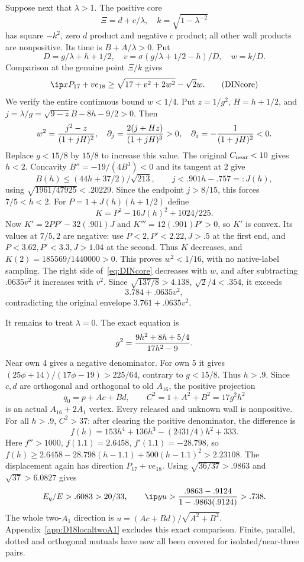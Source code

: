 Suppose next that \(\lambda>1\).
The positive core
\[
 \Xi=d+c/\lambda,\quad k=\sqrt{1-\lambda^{-2}}
\]
has square \(-k^2\), zero \(d\) product and negative \(c\)
product; all other wall products are nonpositive.
Its time is \(B+A/\lambda>0\).
Put
\[
 D=g/\lambda+h+1/2,\quad
 v=\sigma(g/\lambda+1/2-h)/D,\quad w=k/D.
\]
Comparison at the genuine point \(\Xi/k\) gives
\[
 \ip x{P_{17}+ve_{18}}
 \ge\sqrt{17+v^2+2w^2}-\sqrt2w .
\tag{DINcore}\label{eq:DINcore}
\]
We verify the entire continuous bound \(w<1/4\).
Put \(z=1/g^2\), \(H=h+1/2\), and
\(j=\lambda/g=\sqrt{9-z}B-8h-9/2>0\).
Then
\[
 w^2={j^2-z\over(1+jH)^2},\quad
 \partial_j={2(j+Hz)\over(1+jH)^3}>0,\quad
 \partial_z=-{1\over(1+jH)^2}<0 .
\]
Replace \(g<15/8\) by \(15/8\) to increase this value.
The original \(C_{\rm near}<10\) gives \(h<2\).
Concavity \(B''=-19/(4B^3)<0\) and its tangent at 2 give
\[
 B(h)\le(44h+37/2)/\sqrt{213},\qquad
 j<.901h-.757=:J(h),
\]
using \(\sqrt{1961/47925}<.20229\).
Since the endpoint \(j>8/15\), this forces \(7/5<h<2\).
For \(P=1+J(h)(h+1/2)\) define
\[
 K=P^2-16J(h)^2+1024/225 .
\]
Now \(K'=2PP'-32(.901)J\) and
\(K'''=12(.901)P'>0\), so \(K'\) is convex.
Its values at \(7/5,2\) are negative:
use \(P<2,P'<2.22,J>.5\) at the first end,
and \(P<3.62,P'<3.3,J>1.04\) at the second.
Thus \(K\) decreases, and
\(K(2)=185569/1440000>0\).
This proves \(w^2<1/16\), with no native-label sampling.
The right side of~\eqref{eq:DINcore} decreases with \(w\),
and after subtracting \(.0635v^2\) it increases with \(v^2\).
Since \(\sqrt{137/8}>4.138\), \(\sqrt2/4<.354\), it exceeds
\[
                3.784+.0635v^2,
\]
contradicting the original envelope
\(3.761+.0635v^2\).

It remains to treat \(\lambda=0\).
The exact equation is
\[
 g^2={9h^2+8h+5/4\over17h^2-9}.
\]
Near own 4 gives a negative denominator.
For own 5 it gives
\((25\phi+14)/(17\phi-19)>225/64\), contrary to \(g<15/8\).
Thus \(h>.9\).
Since \(c,d\) are orthogonal and orthogonal to old \(A_{16}\),
the positive projection
\[
 q_0=p+Ac+Bd,\qquad C^2=1+A^2+B^2=17g^2h^2
\]
is an actual \(A_{16}+2A_1\) vertex.
Every released and unknown wall is nonpositive.
For all \(h>.9\), \(C^2>37\):
after clearing the positive denominator, the difference is
\[
 f(h)=153h^4+136h^3-(2431/4)h^2+333.
\]
Here \(f''>1000\), \(f(1.1)=2.6458\), \(f'(1.1)=-28.798\),
so
\(f(h)\ge2.6458-28.798(h-1.1)+500(h-1.1)^2
>2.23108\).
The displacement again has direction \(P_{17}+ve_{18}\).
Using \(\sqrt{36/37}>.9863\) and \(\sqrt{37}>6.0827\)
gives
\[
 E_q/E>.6083>20/33,\qquad
 \ip yu>{.9863-.9124\over1-.9863(.9124)}>.738 .
\]
The whole two-\(A_1\) direction is
\(u=(Ac+Bd)/\sqrt{A^2+B^2}\).
Appendix~\ref{app:D18localtwoA1} excludes this exact comparison.
Finite, parallel, dotted and orthogonal mutuals have now all been
covered for isolated/near-three pairs.

